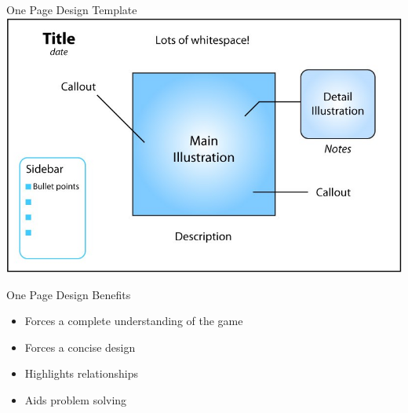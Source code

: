 \begin{frame}{One Page Design Template}
\includegraphics[width=1.0\textwidth]{one_page_design_template}
\end{frame}

\begin{frame}{One Page Design Benefits}
\begin{itemize}
	\item Forces a complete understanding of the game
	\item Forces a concise design
	\item Highlights relationships
	\item Aids problem solving
\end{itemize}

\end{frame}
